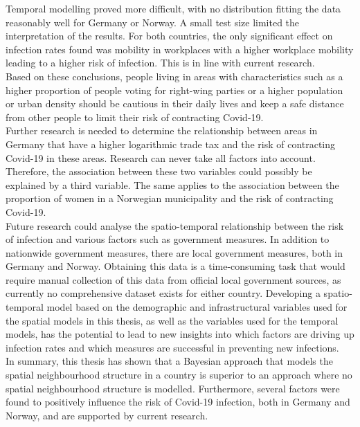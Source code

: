 Temporal modelling proved more difficult, with no distribution fitting the data reasonably well for Germany or Norway. A small test size limited the interpretation of the results. For both countries, the only significant effect on infection rates found was mobility in workplaces with a higher workplace mobility leading to a higher risk of infection. This is in line with current research. \\
Based on these conclusions, people living in areas with characteristics such as a higher proportion of people voting for right-wing parties or a higher population or urban density should be cautious in their daily lives and keep a safe distance from other people to limit their risk of contracting Covid-19. \\
Further research is needed to determine the relationship between areas in Germany that have a higher logarithmic trade tax and the risk of contracting Covid-19 in these areas. Research can never take all factors into account. Therefore, the association between these two variables could possibly be explained by a third variable. The same applies to the association between the proportion of women in a Norwegian municipality and the risk of contracting Covid-19.  \\
Future research could analyse the spatio-temporal relationship between the risk of infection and various factors such as government measures. In addition to nationwide government measures, there are local government measures, both in Germany and Norway. Obtaining this data is a time-consuming task that would require manual collection of this data from official local government sources, as currently no comprehensive dataset exists for either country. Developing a spatio-temporal model based on the demographic and infrastructural variables used for the spatial models in this thesis, as well as the variables used for the temporal models, has the potential to lead to new insights into which factors are driving up infection rates and which measures are successful in preventing new infections. \\
In summary, this thesis has shown that a Bayesian approach that models the spatial neighbourhood structure in a country is superior to an approach where no spatial neighbourhood structure is modelled. Furthermore, several factors were found to positively influence the risk of Covid-19 infection, both in Germany and Norway, and are supported by current research.
